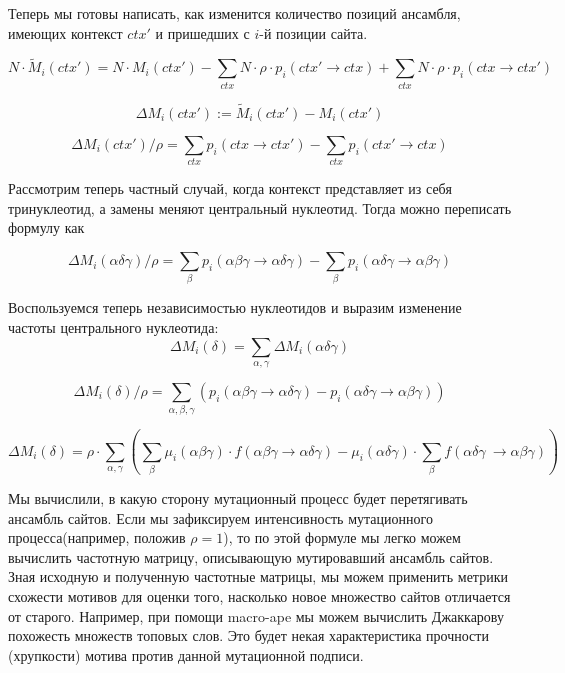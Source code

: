 \documentclass[a4paper]{article}
\begin{document}
Теперь мы готовы написать, как изменится количество позиций ансамбля, имеющих контекст $ctx'$ и пришедших с $i$-й позиции сайта.

\begin{equation}
N\cdot\widetilde{M}_i(ctx') = N\cdot M_i(ctx') - \sum_{ctx} N\cdot\rho\cdot p_i(ctx' \to ctx) + \sum_{ctx} N\cdot\rho\cdot p_i(ctx \to ctx')
\end{equation}

\begin{equation}
\Delta M_i(ctx') := \widetilde{M}_i(ctx') - M_i(ctx')
\end{equation}

\begin{equation}
\boxed{ \Delta M_i(ctx') / \rho = \sum_{ctx} p_i(ctx \to ctx') - \sum_{ctx} p_i(ctx' \to ctx) }
\end{equation}

Рассмотрим теперь частный случай, когда контекст представляет из себя тринуклеотид, а замены меняют центральный нуклеотид. Тогда можно переписать формулу как

\begin{equation}
\Delta M_i(\alpha\delta\gamma) / \rho = \sum_{\beta} p_i(\alpha\beta\gamma \to \alpha\delta\gamma) - \sum_{\beta} p_i(\alpha\delta\gamma \to \alpha\beta\gamma)
\end{equation}

Воспользуемся теперь независимостью нуклеотидов и выразим изменение частоты центрального нуклеотида:
\begin{equation}
\Delta M_i(\delta) = \sum_{\alpha, \gamma}\Delta M_i(\alpha\delta\gamma)
\end{equation}

\begin{equation}
\Delta M_i(\delta) / \rho = \sum_{\alpha,\beta,\gamma}\left(p_i(\alpha\beta\gamma \to \alpha\delta\gamma) - p_i(\alpha\delta\gamma \to \alpha\beta\gamma)\right)
\end{equation}


\begin{equation}
\boxed{
\Delta M_i(\delta) = \rho\cdot\sum_{\alpha,\gamma}\left(\sum_{\beta}\mu_i(\alpha\beta\gamma)\cdot f(\alpha\beta\gamma \to \alpha\delta\gamma) - \mu_i(\alpha\delta\gamma)\cdot\sum_{\beta}f(\alpha\delta\gamma\ \to \alpha\beta\gamma)\right)
}
\end{equation}

Мы вычислили, в какую сторону мутационный процесс будет перетягивать ансамбль сайтов.
Если мы зафиксируем интенсивность мутационного процесса(например, положив $\rho=1$), то по этой формуле мы легко можем вычислить частотную матрицу, описывающую мутировавший ансамбль сайтов. Зная исходную и полученную частотные матрицы, мы можем применить метрики схожести мотивов для оценки того, насколько новое множество сайтов отличается от старого. Например, при помощи macro-ape мы можем вычислить Джаккарову похожесть множеств топовых слов. Это будет некая характеристика прочности (хрупкости) мотива против данной мутационной подписи.
\end{document}
